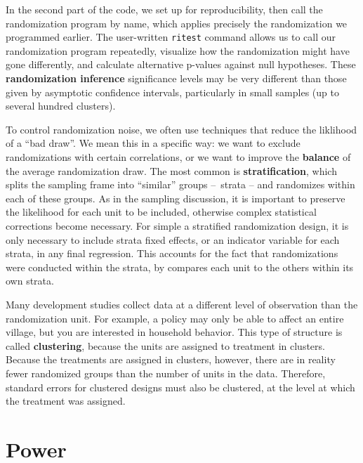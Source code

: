 In the second part of the code, we set up for reproducibility,
then call the randomization program by name,
which applies precisely the randomization we programmed earlier.
The user-written \texttt{ritest} command
allows us to call our randomization program repeatedly,
visualize how the randomization might have gone differently,
and calculate alternative p-values against null hypotheses.
These \textbf{randomization inference} significance levels may be very different
than those given by asymptotic confidence intervals,
particularly in small samples (up to several hundred clusters).



To control randomization noise, we often use techniques that reduce the liklihood of a ``bad draw''.
We mean this in a specific way: we want to exclude randomizations with certain correlations,
or we want to improve the \textbf{balance} of the average randomization draw.
The most common is \textbf{stratification},
which splits the sampling frame into ``similar'' groups – strata –
and randomizes within each of these groups.
As in the sampling discussion, it is important to preserve the likelihood for each unit to be included,
otherwise complex statistical corrections become necessary.
For simple a stratified randomization design,
it is only necessary to include strata fixed effects,
or an indicator variable for each strata, in any final regression.
This accounts for the fact that randomizations were conducted within the strata,
by compares each unit to the others within its own strata.

Many development studies collect data at a different level of observation than the randomization unit.
For example, a policy may only be able to affect an entire village,
but you are interested in household behavior.
This type of structure is called \textbf{clustering},
because the units are assigned to treatment in clusters.
Because the treatments are assigned in clusters, however,
there are in reality fewer randomized groups than the number of units in the data.
Therefore, standard errors for clustered designs must also be clustered,
at the level at which the treatment was assigned.


\section{Power}

